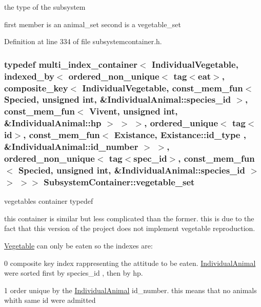 the type of the subsystem 

first member is an animal\_\-set second is a vegetable\_\-set 

Definition at line 334 of file subsystemcontainer.h.

\hypertarget{classSubsystemContainer_aa11de189765005941e3c055feceb3db0}{
\subsubsection[{vegetable\_\-set}]{\setlength{\rightskip}{0pt plus 5cm}typedef multi\_\-index\_\-container$<$ {\bf IndividualVegetable}, indexed\_\-by$<$ ordered\_\-non\_\-unique$<$ tag$<${\bf eat}$>$, composite\_\-key$<$ {\bf IndividualVegetable}, const\_\-mem\_\-fun$<$ {\bf Specied}, unsigned int, \&IndividualAnimal::species\_\-id $>$, const\_\-mem\_\-fun$<$ {\bf Vivent}, unsigned int, \&IndividualAnimal::hp $>$ $>$ $>$, ordered\_\-unique$<$ tag$<${\bf id}$>$, const\_\-mem\_\-fun$<$ {\bf Existance}, {\bf Existance::id\_\-type} , \&IndividualAnimal::id\_\-number $>$ $>$, ordered\_\-non\_\-unique$<$ tag$<${\bf spec\_\-id}$>$, const\_\-mem\_\-fun$<$ {\bf Specied}, unsigned int, \&IndividualAnimal::species\_\-id $>$ $>$ $>$$>$ {\bf SubsystemContainer::vegetable\_\-set}}}
\label{classSubsystemContainer_aa11de189765005941e3c055feceb3db0}


vegetables container typedef 

this container is similar but less complicated than the former. this is due to the fact that this version of the project does not implement vegetable reproduction.

\hyperlink{classVegetable}{Vegetable} can only be eaten so the indexes are:


\begin{DoxyItemize}
\item 0 composite key index rappresenting the attitude to be eaten. \hyperlink{classIndividualAnimal}{IndividualAnimal} were sorted first by species\_\-id , then by hp.
\end{DoxyItemize}


\begin{DoxyItemize}
\item 1 order unique by the \hyperlink{classIndividualAnimal}{IndividualAnimal} id\_\-number. this means that no animals whith same id were admitted
\end{DoxyItemize}


